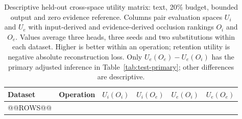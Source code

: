 \begin{table}[!htbp]\centering\small
\caption{Descriptive held-out cross-space utility matrix: text, 20\% budget, bounded output and zero evidence reference. Columns pair evaluation spaces $U_i$ and $U_e$ with input-derived and evidence-derived occlusion rankings $O_i$ and $O_e$. Values average three heads, three seeds and two substitutions within each dataset. Higher is better within an operation; retention utility is negative absolute reconstruction loss. Only $U_e(O_e)-U_e(O_i)$ has the primary adjusted inference in Table~\ref{tab:test-primary}; other differences are descriptive.}\label{tab:test-space-matrix}
\begin{tabular}{llrrrr}\toprule
Dataset & Operation & $U_i(O_i)$ & $U_i(O_e)$ & $U_e(O_i)$ & $U_e(O_e)$ \\\midrule
@@ROWS@@
\bottomrule\end{tabular}
\end{table}
